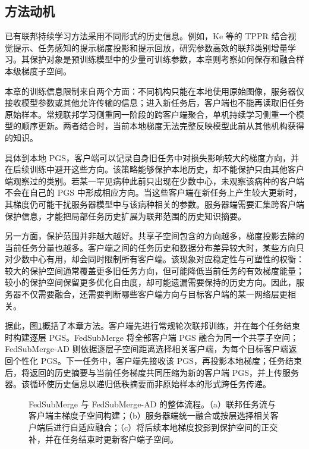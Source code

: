 \subsection{方法动机}
\label{sec:fedsubmerge-motivation}

已有联邦持续学习方法采用不同形式的历史信息。例如，Ke 等的 TPPR 结合视觉提示、任务感知的提示梯度投影和提示回放，研究参数高效的联邦类别增量学习\cite{ke2025tppr}。其保护对象是预训练模型中的少量可训练参数，本章则考察如何保存和融合样本级梯度子空间。

本章的训练信息限制来自两个方面：不同机构只能在本地使用原始图像，服务器仅接收模型参数或其他允许传输的信息；进入新任务后，客户端也不能再读取旧任务原始样本。常规联邦学习侧重同一阶段的跨客户端聚合，单机持续学习侧重一个模型的顺序更新。两者结合时，当前本地梯度无法完整反映模型此前从其他机构获得的知识。

具体到本地 PGS，客户端可以记录自身旧任务中对损失影响较大的梯度方向，并在后续训练中避开这些方向。该策略能够保护本地历史，却不能保护只由其他客户端观察过的类别。若某一罕见病种此前只出现在少数中心，未观察该病种的客户端不会在自己的 PGS 中形成相应方向。当这些客户端在新任务上产生较大更新时，其梯度仍可能干扰服务器模型中与该病种相关的参数。服务器端需要汇集跨客户端保护信息，才能把局部任务历史扩展为联邦范围的历史知识摘要。

另一方面，保护范围并非越大越好。共享子空间包含的方向越多，梯度投影去除的当前任务分量也越多。客户端之间的任务历史和数据分布差异较大时，某些方向只对少数中心有用，却会同时限制所有客户端。该现象对应稳定性与可塑性的权衡：较大的保护空间通常覆盖更多旧任务方向，但可能降低当前任务的有效梯度能量；较小的保护空间保留更多优化自由度，却可能遗漏需要保持的历史方向。因此，服务器不仅需要融合，还需要判断哪些客户端方向与目标客户端的某一网络层更相关。

据此，图\ref{fig:fedsubmerge-overview}概括了本章方法。客户端先进行常规轮次联邦训练，并在每个任务结束时构建逐层 PGS。FedSubMerge 将全部客户端 PGS 融合为同一个共享子空间；FedSubMerge-AD 则依据逐层子空间距离选择相关客户端，为每个目标客户端返回个性化 PGS。下一任务中，客户端先接收该 PGS，再投影本地梯度；任务结束后，将返回的历史摘要与当前任务梯度共同压缩为新的客户端 PGS，并上传服务器。该循环使历史信息以递归低秩摘要而非原始样本的形式跨任务传递。

\begin{figure}[htbp]
\centering
{}
\caption[FedSubMerge 与 FedSubMerge-AD 的整体流程]{FedSubMerge 与 FedSubMerge-AD 的整体流程。（a）联邦任务流与客户端主梯度子空间构建；（b）服务器端统一融合或按层选择相关客户端后进行自适应融合；（c）将后续本地梯度投影到保护空间的正交补，并在任务结束时更新客户端子空间。}
\label{fig:fedsubmerge-overview}
\end{figure}


